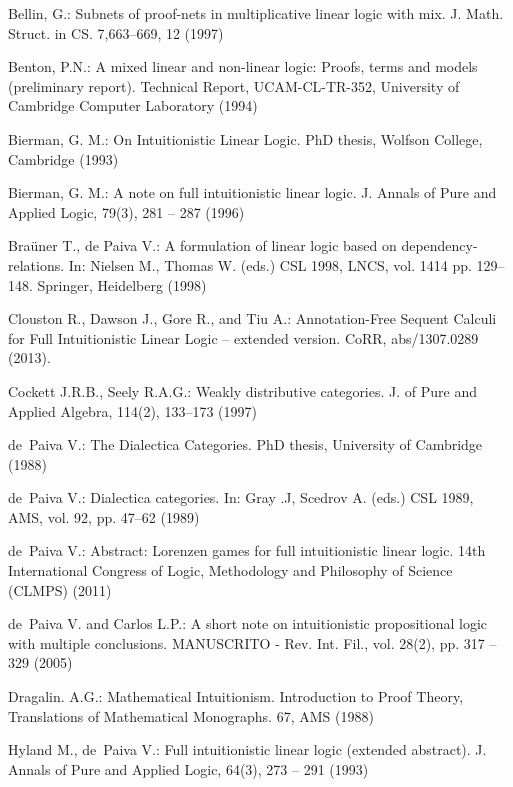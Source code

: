 \documentclass{elsarticle}
\begin{document}
\begin{thebibliography}{4}

 Bellin, G.: Subnets of proof-nets in
  multiplicative linear logic with mix. J. Math. Struct. in
  CS. 7,663--669, 12 (1997)

 Benton, P.N.: A mixed linear and non-linear
  logic: Proofs, terms and models (preliminary report). Technical
  Report, UCAM-CL-TR-352, University of Cambridge Computer Laboratory
  (1994)

 Bierman, G. M.: On Intuitionistic Linear
  Logic. PhD thesis, Wolfson College, Cambridge (1993)

 Bierman, G. M.: A note on full intuitionistic
  linear logic.  J. Annals of Pure and Applied Logic, 79(3), 281 --
  287 (1996)

 Bra\"uner T., de Paiva V.: A formulation of
  linear logic based on dependency-relations. In: Nielsen M., Thomas
  W. (eds.) CSL 1998, LNCS, vol. 1414 pp. 129--148. Springer,
  Heidelberg (1998)

 Clouston R., Dawson J., Gore R., and Tiu A.:
  Annotation-Free Sequent Calculi for Full Intuitionistic Linear Logic
  -- extended version. CoRR, abs/1307.0289 (2013).

 Cockett J.R.B., Seely R.A.G.: Weakly
  distributive categories. J. of Pure and Applied Algebra, 114(2),
  133--173 (1997)

 de~Paiva V.: The Dialectica Categories. PhD
  thesis, University of Cambridge (1988)

 de~Paiva V.: Dialectica categories. In: Gray
  .J, Scedrov A. (eds.)  CSL 1989, AMS, vol. 92, pp. 47--62 (1989)

 de~Paiva V.: Abstract: Lorenzen games for full
  intuitionistic linear logic. 14th International Congress of Logic,
  Methodology and Philosophy of Science (CLMPS) (2011)

 de~Paiva V. and Carlos L.P.: A short note on
  intuitionistic propositional logic with multiple conclusions.
  MANUSCRITO - Rev. Int. Fil., vol. 28(2), pp. 317 -- 329 (2005)

 Dragalin. A.G.: Mathematical Intuitionism. Introduction to Proof Theory,
  Translations of Mathematical Monographs. 67, AMS (1988)

 Hyland M., de~Paiva V.: Full intuitionistic
  linear logic (extended abstract). J. Annals of Pure and Applied
  Logic, 64(3), 273 -- 291 (1993)


\end{thebibliography}
\end{document}
